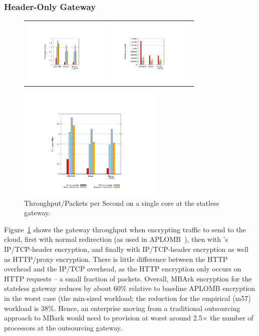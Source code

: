 \subsubsection{Header-Only Gateway}
\begin{figure}[t]
  \centering
  \begin{tabular}{cc}
  \includegraphics[height=1.25in]{fig/gatewayxput}&
  \includegraphics[height=1.25in]{fig/gateway_pps}\\
  \end{tabular}
  \includegraphics[width=2.75in]{fig/key}
  \vspace{-10pt}
  \caption[]{\label{fig:gwxput} Throughput/Packets per Second on a single core at the statless gateway.}
  \vspace{-10pt}
\end{figure}

Figure~\ref{fig:gwxput} shows the gateway throughput when encrypting traffic to send to the cloud, first with normal redirection (as used in APLOMB~\cite{aplomb}), then with \sys's IP/TCP-header encryption, and finally with IP/TCP-header encryption as well as HTTP/proxy encryption. There is little difference between the HTTP overhead and the IP/TCP overhead, as the HTTP encryption only occurs on HTTP requests -- a small fraction of packets. Overall, MBArk encryption for the stateless gateway reduces by about 60\% relative to baseline APLOMB encryption in the worst case (the min-sized workload; the reduction for the empirical (m57) workload is 38\%. Hence, an enterprise moving from a traditional outsourcing approach to MBark would need to provision at worst around 2.5$\times$ the number of processors at the outsourcing gateway.

